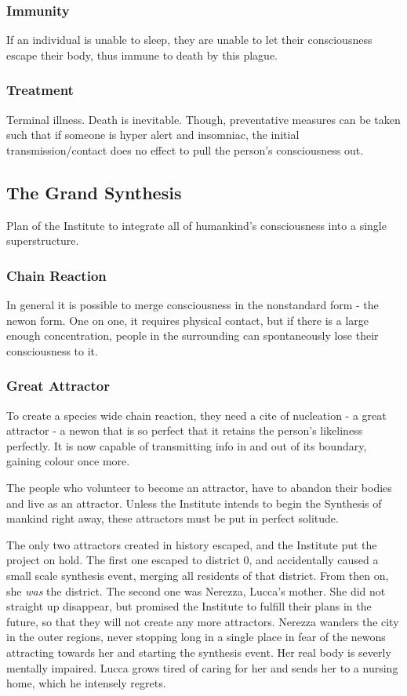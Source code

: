 \documentclass[11pt]{article}
\begin{document}
		\subsubsection{Immunity}
		If an individual is unable to sleep, they are unable to let their consciousness escape their body, thus immune to death by this plague.
		\subsubsection{Treatment}
		Terminal illness. 
		Death is inevitable.
		Though, preventative measures can be taken such that if someone is hyper alert and insomniac, the initial transmission/contact does no effect to pull the person's consciousness out.
		
	\subsection{The Grand Synthesis}
	Plan of the Institute to integrate all of humankind's consciousness into a single superstructure.
		\subsubsection{Chain Reaction}
		In general it is possible to merge consciousness in the nonstandard form - the newon form. 
		One on one, it requires physical contact, but if there is a large enough concentration, people in the surrounding can spontaneously lose their consciousness to it.
		\subsubsection{Great Attractor}
		To create a species wide chain reaction, they need a cite of nucleation - a great attractor - a newon that is so perfect that it retains the person's likeliness perfectly. It is now capable of transmitting info in and out of its boundary, gaining colour once more.
		
		The people who volunteer to become an attractor, have to abandon their bodies and live as an attractor. Unless the Institute intends to begin the Synthesis of mankind right away, these attractors must be put in perfect solitude. 
		
		The only two attractors created in history escaped, and the Institute put the project on hold. 
		The first one escaped to district 0, and accidentally caused a small scale synthesis event, merging all residents of that district. 
		From then on, she \textit{was} the district.
		The second one was Nerezza, Lucca's mother. She did not straight up disappear, but promised the Institute to fulfill their plans in the future, so that they will not create any more attractors. 
		Nerezza wanders the city in the outer regions, never stopping long in a single place in fear of the newons attracting towards her and starting the synthesis event. 
		Her real body is severly mentally impaired. 
		Lucca grows tired of caring for her and sends her to a nursing home, which he intensely regrets.
\end{document}
